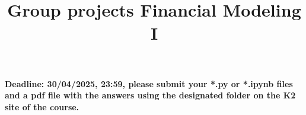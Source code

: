 \documentclass{article}
\title{Group projects Financial Modeling I}
\author{}
\date{}
\begin{document}
\maketitle

\textbf{Deadline: 30/04/2025, 23:59,  please submit your *.py or *.ipynb files and a pdf file with the answers 
       using the designated folder on the K2 site of the course.}




\end{document}
